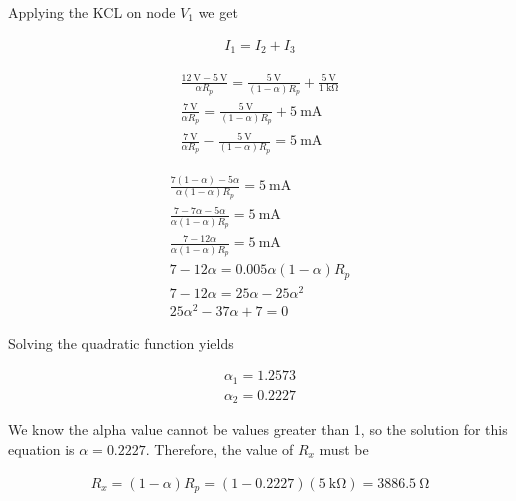 \documentclass{article}
\begin{document}
	Applying the KCL on node $V_1$ we get
	
	\begin{align}
		I_1 = I_2 + I_3 \nonumber
	\end{align}
	
	\begin{align}
		\frac{\qty{12}{\volt} - \qty{5}{\volt}}{\alpha R_p} = \frac{\qty{5}{\volt}}{(1-\alpha)R_p} + \frac{\qty{5}{\volt}}{\qty{1}{\kohm}} \nonumber \\
		\frac{\qty{7}{\volt}}{\alpha R_p} = \frac{\qty{5}{\volt}}{(1-\alpha)R_p} + \qty{5}{\milli\ampere} \nonumber \\
		\frac{\qty{7}{\volt}}{\alpha R_p} - \frac{\qty{5}{\volt}}{(1-\alpha)R_p} = \qty{5}{\milli\ampere} \nonumber
	\end{align}
	
	\begin{align}
		\frac{7(1 - \alpha) - 5\alpha}{\alpha (1 - \alpha) R_p} = \qty{5}{\milli\ampere} \nonumber \\
		\frac{7 - 7\alpha - 5\alpha}{\alpha (1 - \alpha) R_p} = \qty{5}{\milli\ampere} \nonumber \\
		\frac{7 - 12 \alpha}{\alpha (1 - \alpha) R_p} = \qty{5}{\milli\ampere} \nonumber \\
		7 - 12\alpha = 0.005\alpha (1-\alpha)R_p \nonumber \\
		7 - 12\alpha = 25\alpha - 25 \alpha ^2 \nonumber \\
		25 \alpha ^2 - 37\alpha + 7 = 0
	\end{align}
	
	Solving the quadratic function yields
	
	\begin{align}
		\alpha_1 = 1.2573 \nonumber \\
		\alpha_2 = 0.2227 \nonumber
	\end{align}
	
	We know the alpha value cannot be values greater than 1, so the solution for this equation is $\alpha=0.2227$. Therefore, the value of $R_x$ must be
	
	\begin{align}
		R_x = (1 - \alpha) R_p = (1 - 0.2227)(\qty{5}{\kohm}) = \qty{3886.5}{\ohm}
	\end{align}
	
\end{document}
